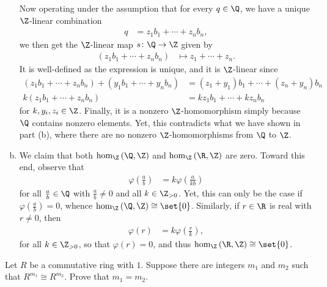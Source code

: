 \documentclass[10pt]{mypackage}
\begin{document}
\begin{solution}
\begin{enumerate}[(a)]
      Now operating under the assumption that for every $q\in \Q$, we have a unique $\Z$-linear combination
      \begin{align*}
        q &= z_1b_1 + \cdots + z_nb_n,
      \end{align*}
      we then get the $\Z$-linear map $s\colon \Q\rightarrow \Z$ given by
      \begin{align*}
        \left( z_1 b_1 + \cdots + z_n b_n \right) &\mapsto z_1 + \cdots + z_n.
      \end{align*}
      It is well-defined as the expression is unique, and it is $\Z$-linear since
      \begin{align*}
        \left( z_1 b_1 + \cdots + z_n b_n \right) + \left( y_1 b_1 + \cdots + y_n b_n \right) &= \left( z_1 + y_1 \right) b_1 + \cdots + \left( z_n + y_n \right)b_n\\
        k\left( z_1 b_1 + \cdots + z_n b_n \right) &= kz_1 b_1 + \cdots + kz_n b_n
      \end{align*}
      for $k,y_i,z_i\in \Z$. Finally, it is a nonzero $\Z$-homomorphism simply because $\Q$ contains nonzero elements. Yet, this contradicts what we have shown in part (b), where there are no nonzero $\Z$-homomorphisms from $\Q$ to $\Z$.
    \item We claim that both $\hom_{\Z}\left( \Q,\Z \right)$ and $\hom_{\Z}\left( \R,\Z \right)$ are zero. Toward this end, observe that
      \begin{align*}
        \varphi\left( \frac{a}{b} \right) &= k\varphi\left( \frac{a}{kb} \right)
      \end{align*}
      for all $\frac{a}{b}\in \Q$ with $\frac{a}{b}\neq 0$ and all $k\in \Z_{ > 0 }$. Yet, this can only be the case if $\varphi\left( \frac{a}{b} \right)= 0$, whence $\hom_{\Z}\left( \Q,\Z \right) \cong \set{0}$. Similarly, if $r\in \R$ is real with $r\neq 0$, then
      \begin{align*}
        \varphi\left( r \right) &= k\varphi\left( \frac{r}{k} \right),
      \end{align*}
      for all $k\in \Z_{ > 0 }$, so that $\varphi\left( r \right) = 0$, and thus $\hom_{\Z}\left( \R,\Z \right)\cong \set{0}$.
  \end{enumerate}
\end{solution}
\begin{problem}[Problem 2]
  Let $R$ be a commutative ring with $1$. Suppose there are integers $m_1$ and $m_2$ such that $R^{m_1}\cong R^{m_2}$. Prove that $m_1 = m_2$.
\end{problem}
\end{document}
